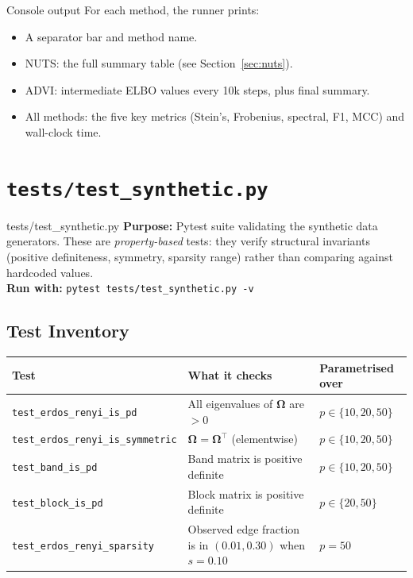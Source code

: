 \documentclass[11pt,a4paper]{article}
\newcommand{\bOmega}{\bm{\Omega}}
\begin{document}
\begin{outputguide}{Console output}
For each method, the runner prints:
\begin{itemize}[nosep]
  \item A separator bar and method name.
  \item NUTS: the full summary table (see Section~\ref{sec:nuts}).
  \item ADVI: intermediate ELBO values every 10k steps, plus final summary.
  \item All methods: the five key metrics (Stein's, Frobenius, spectral, F1, MCC) and wall-clock time.
\end{itemize}
\end{outputguide}


\section{\texttt{tests/test\_synthetic.py}}\label{sec:tests}

\begin{filecard}{tests/test\_synthetic.py}
\textbf{Purpose:} Pytest suite validating the synthetic data generators. These are \emph{property-based} tests: they verify structural invariants (positive definiteness, symmetry, sparsity range) rather than comparing against hardcoded values.
\\[0.3em]
\textbf{Run with:} \texttt{pytest tests/test\_synthetic.py -v}
\end{filecard}

\subsection{Test Inventory}

\begin{center}
\begin{tabular}{@{}lp{6cm}l@{}}
\toprule
\textbf{Test} & \textbf{What it checks} & \textbf{Parametrised over} \\
\midrule
\texttt{test\_erdos\_renyi\_is\_pd} & All eigenvalues of $\bOmega$ are $> 0$ & $p \in \{10, 20, 50\}$ \\
\texttt{test\_erdos\_renyi\_is\_symmetric} & $\bOmega = \bOmega^\top$ (elementwise) & $p \in \{10, 20, 50\}$ \\
\texttt{test\_band\_is\_pd} & Band matrix is positive definite & $p \in \{10, 20, 50\}$ \\
\texttt{test\_block\_is\_pd} & Block matrix is positive definite & $p \in \{20, 50\}$ \\
\texttt{test\_erdos\_renyi\_sparsity} & Observed edge fraction is in $(0.01, 0.30)$ when $s=0.10$ & $p = 50$ \\
\bottomrule
\end{tabular}
\end{center}
\end{document}

